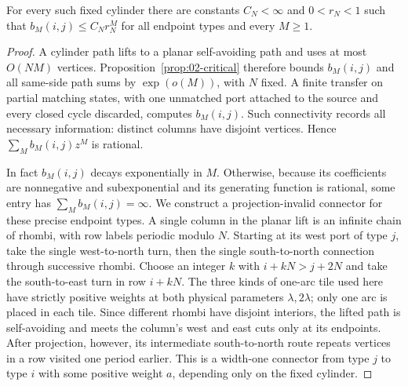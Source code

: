 \begin{lemma}\label{lem:02-periodic-slab}
For every such fixed cylinder there are constants $C_N<\infty$ and
$0<r_N<1$ such that $b_M(i,j)\le C_Nr_N^M$ for all endpoint types
and every $M\ge1$.
\end{lemma}
\begin{proof}
A cylinder path
lifts to a planar self-avoiding path and uses at most $O(NM)$ vertices.
Proposition~\ref{prop:02-critical} therefore bounds $b_M(i,j)$ and
all same-side path sums by $\exp(o(M))$, with $N$ fixed.
A finite transfer on partial matching states, with one unmatched port
attached to the source and every closed cycle discarded, computes
$b_M(i,j)$. Such connectivity records all necessary information:
distinct columns have disjoint vertices. Hence
$\sum_Mb_M(i,j)z^M$ is rational.

In fact $b_M(i,j)$ decays exponentially in $M$. Otherwise, because
its coefficients are nonnegative and subexponential and its generating
function is rational, some entry has $\sum_Mb_M(i,j)=\infty$.
We construct a projection-invalid connector for these precise endpoint
types. A single column in the planar lift is an infinite chain of
rhombi, with row labels periodic modulo $N$. Starting at its west port
of type $j$, take the single west-to-north turn, then the single
south-to-north connection through successive rhombi. Choose an integer
$k$ with $i+kN>j+2N$ and take the south-to-east turn in row $i+kN$.
The three kinds of one-arc tile used here have strictly positive
weights at both physical parameters $\lambda,2\lambda$; only one arc
is placed in each tile. Since different rhombi have disjoint interiors,
the lifted path is self-avoiding and meets the column's west and east
cuts only at its endpoints. After projection, however, its intermediate
south-to-north route repeats vertices in a row visited one period
earlier. This is a width-one connector from type $j$ to type $i$ with
some positive weight $a$, depending only on the fixed cylinder.


\end{proof}

